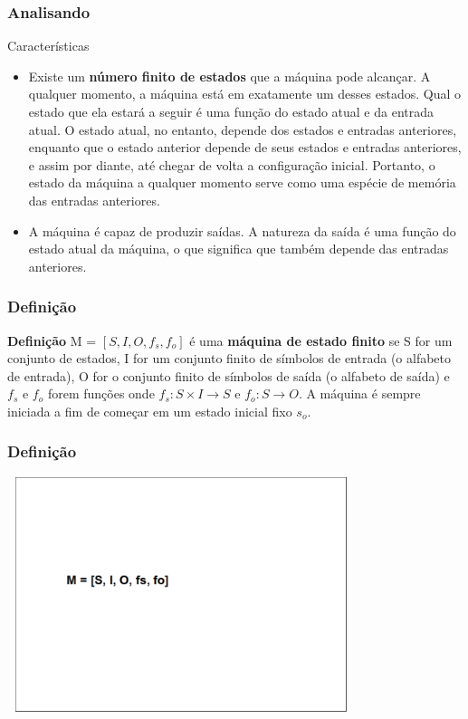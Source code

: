 \documentclass{beamer}
\begin{document}
  \begin{frame}
   \frametitle{Analisando}
       \begin{block}{Características}
	\begin{itemize}
	\item Existe um \textbf{número finito de estados} que a máquina pode alcançar. A qualquer momento, a máquina está em exatamente um desses 
	      estados. Qual o estado que ela estará a seguir é uma função do estado atual e da entrada atual. O estado atual, no entanto, depende 
	      dos estados e entradas anteriores, enquanto que o estado anterior depende de seus estados e entradas anteriores, e assim por diante, 
	      até chegar de volta a configuração inicial. Portanto, o estado da máquina a qualquer momento serve como uma espécie de memória das 
	      entradas anteriores.\pause
	 \item A máquina é capaz de produzir saídas. A natureza da saída é uma função do estado atual da máquina, o que significa que também depende 
	      das entradas anteriores. 
	\end{itemize}
      \end{block}
  \end{frame}

  \begin{frame}
   \frametitle{Definição}
       \begin{block}{\textbf{Definição}}
	  M = $[S, I, O, f_s, f_o]$ é uma \textbf{máquina de estado finito} se S for um conjunto de estados, I for um conjunto finito de símbolos de entrada (o 
	  alfabeto de entrada), O for o conjunto finito de símbolos de saída (o alfabeto de saída) e $f_s$ e $f_o$ forem funções onde $f_s: S\times I \xrightarrow{} S$ e 
	  $f_o: S \xrightarrow{} O$. A máquina é sempre iniciada a fim de começar em um estado inicial fixo $s_o$. 
      \end{block}
  \end{frame}

  \begin{frame}
   \frametitle{Definição}
       \includegraphics[height=2.7in, width=4in]{entendendo_definicao_1.png}
  \end{frame}
\end{document}
